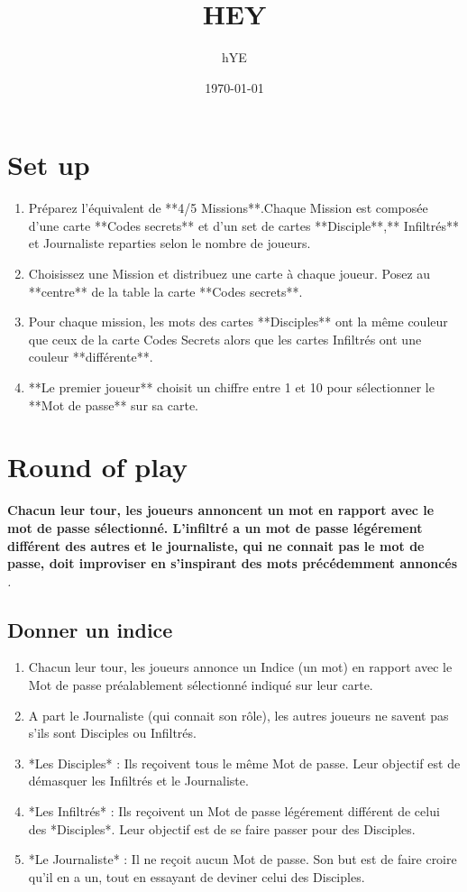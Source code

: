 \documentclass{article}%
\title{HEY}%
\author{hYE}%
\date{\today}%
\begin{document}
%
\pagestyle{empty}%
\normalsize%
\maketitle%
\section{ Set up
}%
\label{sec:Setup}%
\begin{enumerate}%
\item%
 Préparez l'équivalent de **4/5 Missions**.Chaque Mission est composée d'une carte **Codes secrets** et d'un set de cartes **Disciple**,** Infiltrés** et Journaliste reparties selon le nombre de joueurs.
%
\item%
 Choisissez une Mission et distribuez une carte à chaque joueur. Posez au **centre** de la table la carte **Codes secrets**.
%
\item%
 Pour chaque mission, les mots des cartes **Disciples** ont la même couleur que ceux de la carte Codes Secrets alors que les cartes Infiltrés ont une couleur **différente**.
%
\item%
 **Le premier joueur** choisit un chiffre entre 1 et 10 pour sélectionner le **Mot de passe** sur sa carte.
%
\end{enumerate}

%
\section{ Round of play
}%
\label{sec:Roundofplay}%
\textbf{Chacun leur tour, les joueurs annoncent un mot en rapport avec le mot de passe sélectionné. L'infiltré a un mot de passe légérement différent des autres et le journaliste, qui ne connait pas le mot de passe, doit improviser en s'inspirant des mots précédemment annoncés}%
\textit{.
}

%
\subsection{ Donner un indice
}%
\label{subsec:Donnerunindice}%
\begin{enumerate}%
\item%
 Chacun leur tour, les joueurs annonce un Indice (un mot) en rapport avec le Mot de passe préalablement sélectionné indiqué sur leur carte.
%
\item%
 A part le Journaliste (qui connait son rôle), les autres joueurs ne savent pas s'ils sont Disciples ou Infiltrés.
%
\item%
 *Les Disciples* : Ils reçoivent tous le même Mot de passe. Leur objectif est de démasquer les Infiltrés et le Journaliste.
%
\item%
 *Les Infiltrés* : Ils reçoivent un Mot de passe légérement différent de celui des *Disciples*. Leur objectif est de se faire passer pour des Disciples.
%
\item%
 *Le Journaliste* : Il ne reçoit aucun Mot de passe. Son but est de faire croire qu'il en a un, tout en essayant de deviner celui des Disciples.
%
\end{enumerate}
\end{document}

